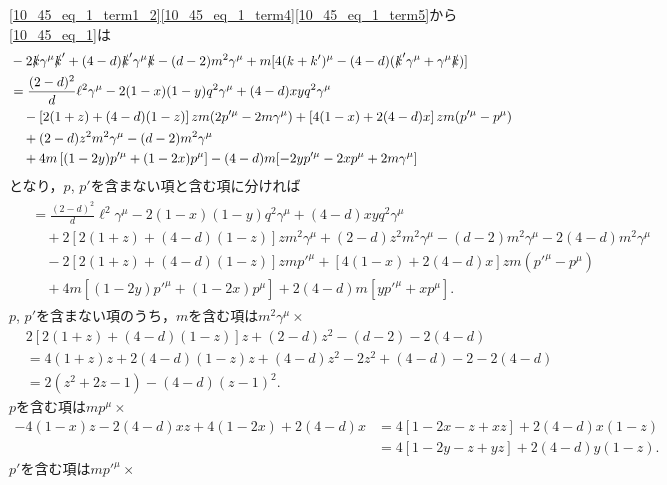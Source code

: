 \eqref{10_45_eq_1_term1_2}\eqref{10_45_eq_1_term4}\eqref{10_45_eq_1_term5}から\eqref{10_45_eq_1}は
  \begin{align*}
  & -2 \slashed{k} \gamma^\mu \slashed{k}' + (4-d) \slashed{k}' \gamma^\mu \slashed{k}
  - (d-2) m^2 \gamma^\mu + m [ 4(k+k')^\mu - (4-d) (\slashed{k}'\gamma^\mu + \gamma^\mu\slashed{k}) ] \\
  &= \frac{(2-d)^2}{d} \ell^2 \gamma^\mu - 2 (1-x)(1-y) q^2 \gamma^\mu
  + (4-d) xy q^2 \gamma^\mu \\
  & \quad - \left[ 2(1+z) + (4-d)(1-z) \right] zm (2p'^\mu  - 2m\gamma^\mu)
  + \left[ 4(1-x) + 2(4-d)x \right] zm (p'^\mu - p^\mu) \\
  & \quad + (2-d) z^2m^2\gamma^\mu - (d-2) m^2 \gamma^\mu \\
  & \quad + 4m \left[ (1-2y) p'^\mu + (1 - 2x) p^\mu \right] - (4-d) m [ -2yp'^\mu - 2x p^\mu + 2m\gamma^\mu ]
\end{align*}
となり，$p$, $p'$を含まない項と含む項に分ければ
\begin{align}
  \begin{split}
    &= \frac{(2-d)^2}{d} \ell^2 \gamma^\mu - 2 (1-x)(1-y) q^2 \gamma^\mu
    + (4-d) xy q^2 \gamma^\mu \\
    & \quad + 2 \left[ 2(1+z) + (4-d)(1-z) \right] zm^2 \gamma^\mu + (2-d) z^2m^2\gamma^\mu - (d-2) m^2 \gamma^\mu - 2 (4-d) m^2 \gamma^\mu \\
    & \quad - 2 \left[ 2(1+z) + (4-d)(1-z) \right] zm p'^\mu + \left[ 4(1-x) + 2(4-d)x \right] zm (p'^\mu - p^\mu) \\
    & \quad + 4m \left[ (1-2y) p'^\mu + (1 - 2x) p^\mu \right] + 2 (4-d) m [yp'^\mu + xp^\mu] .
  \end{split}
  \label{10_45_eq_5}
\end{align}
$p$, $p'$を含まない項のうち，$m$を含む項は$m^2 \gamma^\mu \times$
\begin{align*}
  & 2 \left[ 2(1+z) + (4-d)(1-z) \right] z + (2-d) z^2 - (d-2) - 2 (4-d)  \\
  & = 4(1+z) z + 2(4-d)(1-z) z + (4-d) z^2 - 2 z^2  + (4-d) - 2  - 2 (4-d)  \\
  &= 2(z^2 + 2z - 1) - (4-d)(z-1)^2 .
\end{align*}
$p$を含む項は$mp^\mu \times $
\begin{align*}
  -4(1-x)z - 2(4-d)xz + 4(1-2x) + 2(4-d)x &= 4[1 - 2x - z + xz] + 2(4-d) x (1-z) \\
  &= 4 [ 1 - 2y - z + yz ] + 2 (4-d) y (1-z) .
\end{align*}
$p'$を含む項は$mp'^\mu \times $
